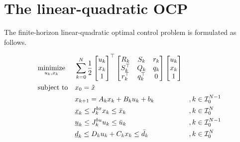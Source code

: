 
\section{The linear-quadratic OCP}
\label{sec:lq_ocp}
The finite-horizon linear-quadratic optimal control problem is formulated as follows.

\[
\begin{aligned}
& \underset{u_k, x_k}{\text{minimize}} & & \sum_{k=0}^{N} \frac{1}{2} \begin{bmatrix} u_{k} \\ x_{k} \\ 1 \end{bmatrix}^\top \begin{bmatrix} R_{k} & S_{k} & r_{k} \\ S_{k}^\top & Q_{k} & q_{k} \\ r_{k}^\top & q_{k}^\top & 0 \end{bmatrix} \begin{bmatrix} u_{k} \\ x_{k} \\ 1 \end{bmatrix} & &                      \\
& \text{subject to}                    & & x_0 = \hat{x}                                                       & &                      \\
&                                      & & x_{k+1} = A_k x_k + B_k u_k + b_k                                   & & ,k\in\mathcal{I}_{0}^{N-1}   \\
&                                      & & \underline{x}_k \leq J_k^{bx} x_k \leq \bar{x}_k                    & & ,k\in\mathcal{I}_{0}^{N}     \\
&                                      & & \underline{u}_k \leq J_k^{bu} u_k \leq \bar{u}_k                    & & ,k\in\mathcal{I}_{0}^{N-1}   \\
&                                      & & \underline{d}_k \leq D_k u_k + C_k x_k \leq \bar{d}_k               & & ,k\in\mathcal{I}_{0}^{N}
\end{aligned}
\]

